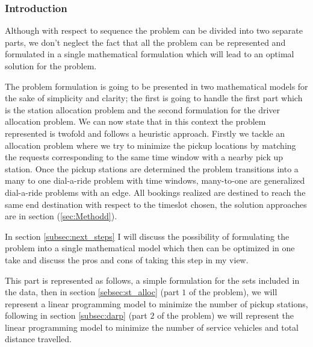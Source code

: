 \documentclass{article}
\begin{document}
\subsubsection{Introduction}
Although with respect to sequence the problem can be divided into two separate parts, we don't neglect the fact that all the problem can be represented and formulated in a single mathematical formulation which will lead to an optimal solution for the problem. 


The problem formulation is going to be presented in two mathematical models for the sake of simplicity and clarity; the first is going to handle the first part which is the station allocation problem and the second formulation for the driver allocation problem. We can now state that in this context the problem represented is twofold and follows a heuristic approach.
Firstly we tackle an allocation problem where we try to minimize the pickup locations by matching the requests corresponding to the same time window with a nearby pick up station. Once the pickup stations are determined the problem transitions into a many to one dial-a-ride problem with time windows, many-to-one are generalized dial-a-ride problems with an edge. All bookings realized are destined to reach the same end destination with respect to the timeslot chosen, the solution approaches are in section (\ref{sec:Methodd}).


In section \ref{subsec:next_steps} I will discuss the possibility of formulating the problem into a single mathematical model which then can be optimized in one take and discuss the pros and cons of taking this step in my view.

This part is represented as follows, a simple formulation for the sets included in the data, then in section \ref{sebsec:st_alloc} (part $1$ of the problem), we will represent a linear programming model to minimize the number of pickup stations, following in section \ref{subsec:darp} (part $2$ of the problem) we will represent the linear programming model to minimize the number of service vehicles and total distance travelled.
\end{document}

